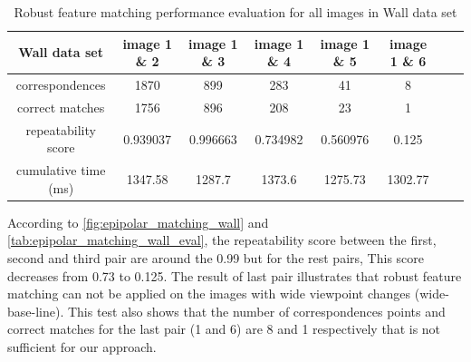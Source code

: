 \begin{table}[H]
  \begin{tabular}{| c || c | c | c | c | c | c | c |}
      \hline
      Wall data set & image 1 \& 2 & image 1 \& 3 & image 1 \& 4 & image 1 \& 5 & image 1 \& 6 \\ \hline \hline
      correspondences & 1870 & 899 & 283 & 41 & 8 \\ \hline
      correct matches & 1756 & 896 & 208 & 23 & 1 \\ \hline
      repeatability score & 0.939037 & 0.996663 & 0.734982 & 0.560976 & 0.125 \\ \hline
      cumulative time (ms) & 1347.58 & 1287.7 & 1373.6 & 1275.73 & 1302.77 \\ \hline
  \end{tabular}
  \caption{Robust feature matching performance evaluation for all images in Wall data set} \label{tab:epipolar_matching_wall_eval}
\end{table}

According to \autoref{fig:epipolar_matching_wall} and \autoref{tab:epipolar_matching_wall_eval}, the repeatability score between the first, second and third pair are around the 0.99 but for the rest pairs, This score decreases from 0.73 to 0.125. The result of last pair illustrates that robust feature matching can not be applied on the images with wide viewpoint changes (wide-base-line). This test also shows that the number of correspondences points and correct matches for the last pair (1 and 6) are 8 and 1 respectively that is not sufficient for our approach.

